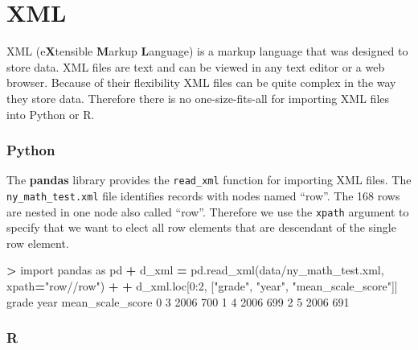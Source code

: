 \documentclass[
]{book}
\newenvironment{Shaded}{\begin{snugshade}}{\end{snugshade}}
\newcommand{\DecValTok}[1]{\textcolor[rgb]{0.00,0.00,0.81}{#1}}
\newcommand{\ImportTok}[1]{#1}
\newcommand{\NormalTok}[1]{#1}
\newcommand{\OperatorTok}[1]{\textcolor[rgb]{0.81,0.36,0.00}{\textbf{#1}}}
\newcommand{\StringTok}[1]{\textcolor[rgb]{0.31,0.60,0.02}{#1}}
\begin{document}
\hypertarget{xml}{%
\section{XML}\label{xml}}

XML (e\textbf{X}tensible \textbf{M}arkup \textbf{L}anguage) is a markup language that was designed to store data. XML files are text and can be viewed in any text editor or a web browser. Because of their flexibility XML files can be quite complex in the way they store data. Therefore there is no one-size-fits-all for importing XML files into Python or R.

\hypertarget{python-13}{%
\subsubsection*{Python}\label{python-13}}

The \textbf{pandas} library provides the \texttt{read\_xml} function for importing XML files. The \texttt{ny\_math\_test.xml} file identifies records with nodes named ``row''. The 168 rows are nested in one node also called ``row''. Therefore we use the \texttt{xpath} argument to specify that we want to elect all row elements that are descendant of the single row element.

\begin{Shaded}
\begin{Highlighting}[]
\OperatorTok{\textgreater{}} \ImportTok{import}\NormalTok{ pandas }\ImportTok{as}\NormalTok{ pd}
\OperatorTok{+}\NormalTok{ d\_xml }\OperatorTok{=}\NormalTok{ pd.read\_xml(}\StringTok{\textquotesingle{}data/ny\_math\_test.xml\textquotesingle{}}\NormalTok{, xpath}\OperatorTok{=}\StringTok{"row//row"}\NormalTok{)}
\OperatorTok{+} 
\OperatorTok{+}\NormalTok{ d\_xml.loc[}\DecValTok{0}\NormalTok{:}\DecValTok{2}\NormalTok{, [}\StringTok{"grade"}\NormalTok{, }\StringTok{"year"}\NormalTok{, }\StringTok{"mean\_scale\_score"}\NormalTok{]]  }
\NormalTok{  grade  year  mean\_scale\_score}
\DecValTok{0}     \DecValTok{3}  \DecValTok{2006}               \DecValTok{700}
\DecValTok{1}     \DecValTok{4}  \DecValTok{2006}               \DecValTok{699}
\DecValTok{2}     \DecValTok{5}  \DecValTok{2006}               \DecValTok{691}
\end{Highlighting}
\end{Shaded}

\hypertarget{r-13}{%
\subsubsection*{R}\label{r-13}}
\end{document}
